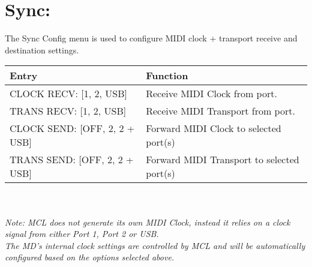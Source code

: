 \newpage

\section{Sync:}
The Sync Config menu is used to configure MIDI clock + transport receive and destination settings.
\\
\begin{tabular}{|l|l|}
\hline
\rowcolor[HTML]{C0C0C0} 
Entry                                  & Function                                                                       \\ \hline
CLOCK RECV: {[}1, 2, USB{]}                & Receive MIDI Clock from port.                                                  \\ \hline
TRANS RECV: {[}1, 2, USB{]}                & Receive MIDI Transport from port.                                               \\ \hline
CLOCK SEND: {[}OFF, 2, 2 + USB{]}          & Forward MIDI Clock to selected port(s)                                            \\ \hline
TRANS SEND: {[}OFF, 2, 2 + USB{]}          & Forward MIDI Transport to selected port(s)                                        \\ \hline
\end{tabular}
\\\\
\textit{Note: MCL does not generate its own MIDI Clock, instead it relies on a clock signal from either Port 1, Port 2 or USB.}
\\
\textit{The MD's internal clock settings are controlled by MCL and will be automatically configured based on the options selected above.}

